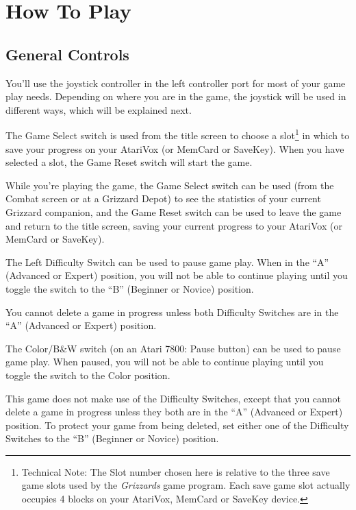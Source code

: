 \documentclass[12pt,twoside,openright,book]{memoir}
\begin{document}
\chapter{How To Play}

\section{General Controls}

You'll use the joystick controller in  the left controller port for most
of your  game play needs.  Depending on where you  are in the  game, the
joystick will be used in different ways, which will be explained next.

The  Game  Select  switch  is  used from  the  title  screen  to  choose
a slot\footnote{Technical Note: The Slot  number chosen here is relative
  to  the three  save game  slots  used by  the \textit{Grizzards}  game
  program.  Each save  game  slot  actually occupies  4  blocks on  your
  AtariVox, MemCard or  SaveKey device.} in which to  save your progress
on your AtariVox (or MemCard or SaveKey). When you have selected a slot,
the Game Reset switch will start the game.

While you're playing the game, the Game Select switch can be used (from the
Combat screen or at a Grizzard Depot) to see the statistics of your current
Grizzard companion, and the Game Reset switch can be used to leave the game
and return to the title screen, saving your current progress to your
AtariVox (or MemCard or SaveKey).

\ifdefined\TVSECAM

The Left Difficulty Switch  can be used to pause game  play. When in the
``A'' (Advanced  or Expert) position, you  will not be able  to continue
playing  until  you  toggle  the   switch  to  the  ``B''  (Beginner  or
Novice) position.

You cannot delete a game in progress unless both Difficulty Switches are
in the ``A'' (Advanced or Expert) position.

\else

The Color/B\&W  switch (on an Atari  7800: Pause button) can  be used to
pause game play.  When paused, you will not be  able to continue playing
until you toggle the switch to the Color position.

This game does not make use  of the Difficulty Switches, except that you
cannot  delete a  game in  progress unless  they both  are in  the ``A''
(Advanced or Expert) position. To  protect your game from being deleted,
set either  one of  the Difficulty  Switches to  the ``B''  (Beginner or
Novice) position.
\end{document}
